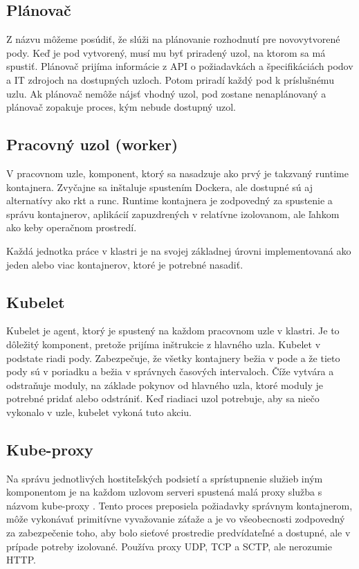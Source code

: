\subsection*{Plánovač}
Z názvu môžeme posúdiť, že slúži na plánovanie rozhodnutí pre novovytvorené pody. Keď je pod vytvorený, musí mu byť priradený uzol, na ktorom sa má spustiť. Plánovač prijíma informácie z API o požiadavkách a špecifikáciách podov a IT zdrojoch na dostupných uzloch. Potom priradí každý pod k príslušnému uzlu. Ak plánovač nemôže nájsť vhodný uzol, pod zostane nenaplánovaný a plánovač zopakuje proces, kým nebude dostupný uzol.

\subsection{Pracovný uzol (worker)}

V pracovnom uzle, komponent, ktorý sa nasadzuje ako prvý je takzvaný runtime kontajnera. Zvyčajne sa inštaluje spustením Dockera, ale dostupné sú aj alternatívy ako rkt a runc. Runtime kontajnera je zodpovedný za spustenie a správu kontajnerov, aplikácií zapuzdrených v relatívne izolovanom, ale ľahkom ako keby operačnom prostredí.

Každá jednotka práce v klastri je na svojej základnej úrovni implementovaná ako jeden alebo viac kontajnerov, ktoré je potrebné nasadiť.

\subsection*{Kubelet}
Kubelet je agent, ktorý je spustený na každom pracovnom uzle v klastri. Je to dôležitý komponent, pretože prijíma inštrukcie z hlavného uzla. Kubelet v podstate riadi pody. Zabezpečuje, že všetky kontajnery bežia v pode a že tieto pody sú v poriadku a bežia v správnych časových intervaloch. Číže vytvára a odstraňuje moduly, na základe pokynov od hlavného uzla, ktoré moduly je potrebné pridať alebo odstrániť. Keď riadiaci uzol potrebuje, aby sa niečo vykonalo v uzle, kubelet vykoná tuto akciu.

\subsection*{Kube-proxy}
Na správu jednotlivých hostiteľských podsietí a sprístupnenie služieb iným komponentom je na každom uzlovom serveri spustená malá proxy služba s názvom kube-proxy . Tento proces preposiela požiadavky správnym kontajnerom, môže vykonávať primitívne vyvažovanie záťaže a je vo všeobecnosti zodpovedný za zabezpečenie toho, aby bolo sieťové prostredie predvídateľné a dostupné, ale v prípade potreby izolované. Používa proxy UDP, TCP a SCTP, ale nerozumie HTTP.

